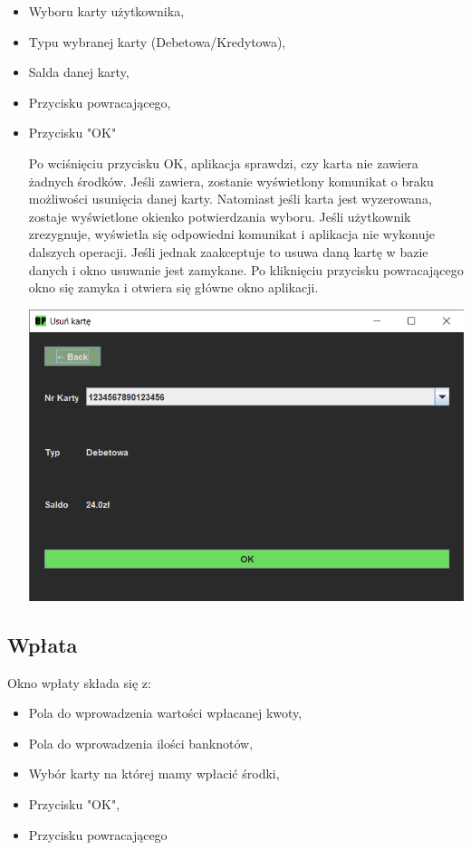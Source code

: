\documentclass[12pt, letterpaper]{article}
\begin{document}
\begin{itemize}
\item Wyboru karty użytkownika,
\item Typu wybranej karty (Debetowa/Kredytowa),
\item Salda danej karty,
\item Przycisku powracającego,
\item Przycisku "OK"

\quad Po wciśnięciu przycisku OK, aplikacja sprawdzi, czy karta nie zawiera żadnych środków. Jeśli zawiera, zostanie wyświetlony komunikat o braku możliwości usunięcia danej karty. Natomiast jeśli karta jest wyzerowana, zostaje wyświetlone okienko potwierdzania wyboru. Jeśli użytkownik zrezygnuje, wyświetla się odpowiedni komunikat i aplikacja nie wykonuje dalszych operacji. 
Jeśli jednak zaakceptuje to usuwa daną kartę w bazie danych i okno usuwanie jest zamykane.
Po kliknięciu przycisku powracającego okno się zamyka i otwiera się główne okno aplikacji.

\begin{center}
	\includegraphics[scale=0.6]{usun}
\end{center}

\end{itemize}

\newpage

\subsection{Wpłata}

\quad Okno wpłaty składa się z:

\begin{itemize}
\item Pola do wprowadzenia wartości wpłacanej kwoty,
\item Pola do wprowadzenia ilości banknotów,
\item Wybór karty na której mamy wpłacić środki,
\item Przycisku "OK",
\item Przycisku powracającego
\end{itemize}
\end{document}
